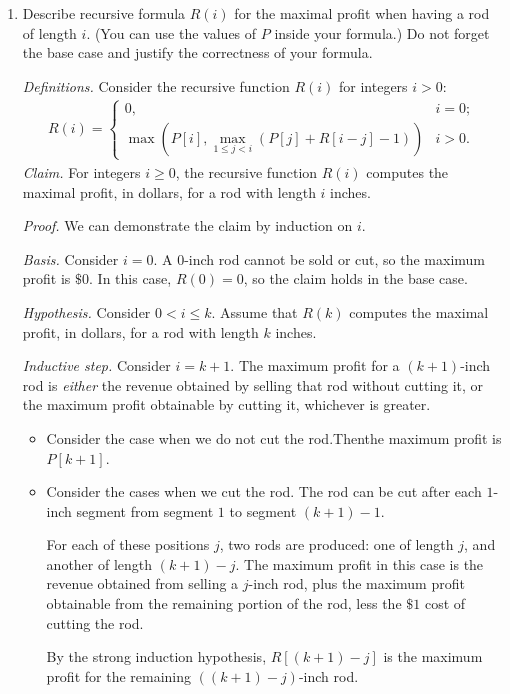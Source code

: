\begin{enumerate}
\item Describe recursive formula $R(i)$ for the maximal profit when having a rod of length $i$. (You can use the values of $P$ inside your formula.) Do not forget the base case and justify the correctness of your formula.
\begin{solution}
\textit{Definitions. }Consider the recursive function $R(i)$ for integers $i>0$:
\begin{align*}
R(i)= 
\begin{cases} 
    0,&i=0;\\
    \max\left(P[i],\underset{1\leq j<i}{\max}\left(P[j]+R[i-j]-1\right)\right)&i>0.
\end{cases}
\end{align*}
\textit{Claim. }For integers $i\geq 0$, the recursive function $R(i)$ computes the maximal profit, in dollars, for a rod with length $i$ inches.

\textit{Proof. }We can demonstrate the claim by induction on $i$.

\textit{Basis. }Consider $i=0$. A $0$-inch rod cannot be sold or cut, so the maximum profit is $\$0$. In this case, $R(0)=0$, so the claim holds in the base case.

\textit{Hypothesis. }Consider $0<i\leq k$. Assume that $R(k)$ computes the maximal profit, in dollars, for a rod with length $k$ inches.

\textit{Inductive step. }Consider $i=k+1$. The maximum profit for a $(k+1)$-inch rod is \textit{either} the revenue obtained by selling that rod without cutting it, or the maximum profit obtainable by cutting it, whichever is greater.

\begin{itemize}
\item Consider the case when we do not cut the rod.Thenthe maximum profit is $P[k+1]$.
\item Consider the cases when we cut the rod. The rod can be cut after each $1$-inch segment from segment $1$ to segment $(k+1)-1$.

For each of these positions $j$, two rods are produced: one of length $j$, and another of length $(k+1)-j$. The maximum profit in this case is the revenue obtained from selling a $j$-inch rod, plus the maximum profit obtainable from the remaining portion of the rod, less the $\$1$ cost of cutting the rod.

By the strong induction hypothesis, $R[(k+1)-j]$ is the maximum profit for the remaining $((k+1)-j)$-inch rod.


\end{itemize}
\end{solution}
\end{enumerate}
